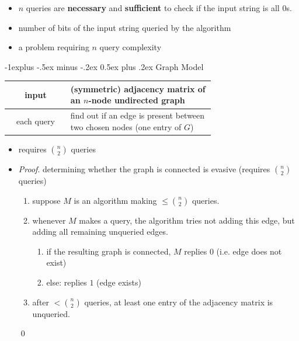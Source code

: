\documentclass[10pt, landscape]{article}
\makeatletter
\renewcommand{\subsection}{\@startsection{subsection}{2}{0mm}%
  {-1explus -.5ex minus -.2ex}%
  {0.5ex plus .2ex}%
{\normalfont\normalsize\bfseries}}
\makeatother
\begin{document}
\begin{multicols*}{4}
  \begin{itemize}
    \item $n$ queries are \textbf{necessary} and \textbf{sufficient} to check if the input string is all 0s.
    \item {} number of bits of the input string queried by the algorithm
    \item {} a problem requiring $n$ query complexity
  \end{itemize}

  \subsection{Graph Model}

  \begin{tightcenter}
    \begin{tabular}{|c|p{0.7\linewidth}|}
      \hline
      input & (symmetric) adjacency matrix of an $n$-node undirected graph \\\hline
      each query & find out if an edge is present between two chosen nodes (one entry of $G$) \\\hline
    \end{tabular}
  \end{tightcenter}

  \begin{itemize}
    \item {} requires $\binom{n}{2}$ queries
    \item \textit{Proof}. determining whether the graph is connected is evasive (requires $\binom{n}{2}$ queries) 
      \begin{enumerate}
        \item suppose $M$ is an algorithm making $\leq \binom{n}{2}$ queries.
        \item whenever $M$ makes a query, the algorithm tries not adding this edge, but adding all remaining unqueried edges. 
          \begin{enumerate}
            \item if the resulting graph is connected, $M$ replies $0$ (i.e. edge does not exist)
            \item else: replies $1$ (edge exists)
          \end{enumerate}
        \item after $< \binom{n}{2}$ queries, at least one entry of the adjacency matrix is unqueried.
      \end{enumerate}
      \qed
  \end{itemize}



\end{multicols*}
\end{document}
